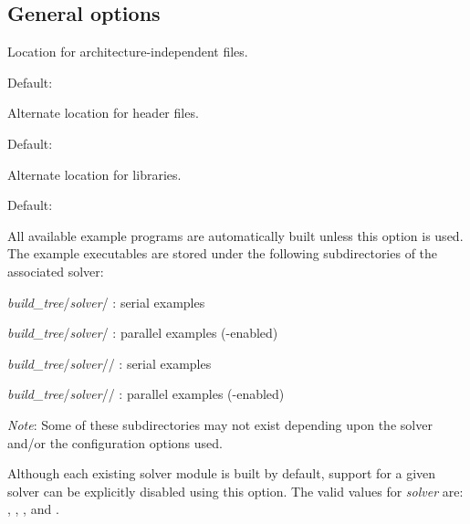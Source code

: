 \subsection*{General options}


\begin{config}
  
\item {}
  
  Location for architecture-independent files.
  
  Default: 
  
\item {}
  
  Alternate location for header files.
  
  Default: 
  
\item {}
  
  Alternate location for libraries.
  
  Default: 

\item {}
  
  All available example programs are automatically built unless this option is
  used. The example executables are stored under the following subdirectories
  of the associated solver: 
  
  \begin{config}
  \item {\em build\_tree}/{\em solver}/ : serial {\C} examples
  \item {\em build\_tree}/{\em solver}/ : parallel {\C} examples ({\mpi}-enabled)
  \item {\em build\_tree}/{\em solver}// : serial {\F} examples
  \item {\em build\_tree}/{\em solver}// : parallel {\F} examples ({\mpi}-enabled)
  \end{config}
  
  {\em Note}: Some of these subdirectories may not exist depending upon the
  solver and/or the configuration options used.
  
\item {}

  Although each existing solver module is built by default, support for a
  given solver can be explicitly disabled using this option. 
  The valid values for {\em solver} are: , , 
  , and .
  

\end{config}
